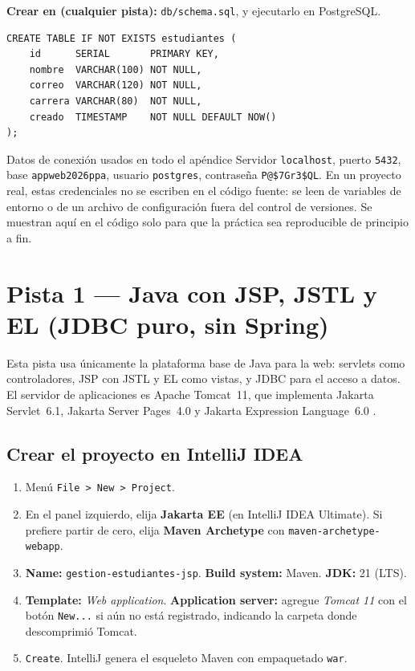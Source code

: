 {\small\textbf{Crear en (cualquier pista):} \texttt{db/schema.sql}, y
ejecutarlo en PostgreSQL.}
\begin{lstlisting}[style=sql,caption={Esquema compartido de la tabla estudiantes},label={lst:crud-schema}]
CREATE TABLE IF NOT EXISTS estudiantes (
    id      SERIAL       PRIMARY KEY,
    nombre  VARCHAR(100) NOT NULL,
    correo  VARCHAR(120) NOT NULL,
    carrera VARCHAR(80)  NOT NULL,
    creado  TIMESTAMP    NOT NULL DEFAULT NOW()
);
\end{lstlisting}

\begin{cajaadvertencia}{Datos de conexión usados en todo el apéndice}
Servidor \texttt{localhost}, puerto \texttt{5432}, base
\texttt{appweb2026ppa}, usuario \texttt{postgres}, contraseña
\texttt{P@\$7Gr3\$QL}. En un proyecto real, estas credenciales no se
escriben en el código fuente: se leen de variables de entorno o de un
archivo de configuración fuera del control de versiones. Se muestran
aquí en el código solo para que la práctica sea reproducible de
principio a fin.
\end{cajaadvertencia}

\section{Pista 1 --- Java con JSP, JSTL y EL (JDBC puro, sin Spring)}
\label{ap:crud:jsp}

Esta pista usa únicamente la plataforma base de Java para la web:
servlets como controladores, JSP con JSTL y EL como vistas, y JDBC para
el acceso a datos. El servidor de aplicaciones es Apache Tomcat~11, que
implementa Jakarta Servlet~6.1, Jakarta Server Pages~4.0 y Jakarta
Expression Language~6.0 \cite{pgjdbc}.

\subsection{Crear el proyecto en IntelliJ IDEA}
\label{ap:crud:jsp:crear}

\begin{enumerate}
\item Menú \texttt{File > New > Project}.
\item En el panel izquierdo, elija \textbf{Jakarta EE} (en IntelliJ
IDEA Ultimate). Si prefiere partir de cero, elija \textbf{Maven
Archetype} con \texttt{maven-archetype-webapp}.
\item \textbf{Name:} \texttt{gestion-estudiantes-jsp}. \textbf{Build
system:} Maven. \textbf{JDK:} 21 (LTS).
\item \textbf{Template:} \emph{Web application}. \textbf{Application
server:} agregue \emph{Tomcat 11} con el botón \texttt{New...} si aún
no está registrado, indicando la carpeta donde descomprimió Tomcat.
\item \texttt{Create}. IntelliJ genera el esqueleto Maven con
empaquetado \texttt{war}.
\end{enumerate}


